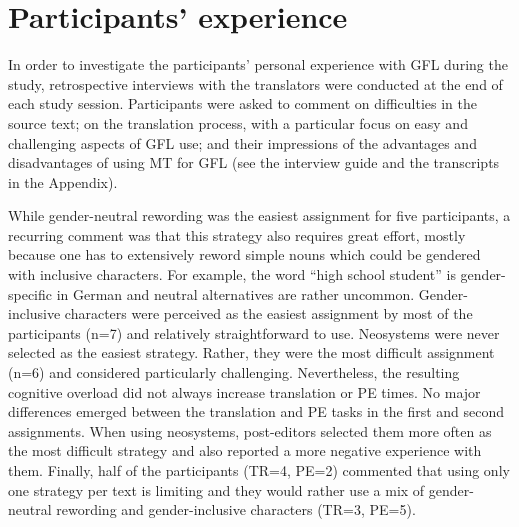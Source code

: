 \section{Participants' experience} \label{sec:cognitiveeffort}
In order to investigate the participants' personal experience with GFL during the study, retrospective interviews with the translators were conducted at the end of each study session. Participants were asked to comment on difficulties in the source text; on the translation process, with a particular focus on easy and challenging aspects of GFL use; and their impressions of the advantages and disadvantages of using MT  for GFL (see the interview guide and the transcripts in the Appendix). %

While gender-neutral rewording was the easiest assignment for five participants, a recurring comment was that this strategy also requires great effort, mostly because one has to extensively reword simple nouns which could be gendered with inclusive characters. For example, the word ``high school student'' is gender-specific in German and neutral alternatives are rather uncommon. Gender-inclusive characters were perceived as the easiest assignment by most of the participants (n=7) and relatively straightforward to use. Neosystems were never selected as the easiest strategy. Rather, they were the most difficult assignment (n=6) and considered particularly challenging. Nevertheless, the resulting cognitive overload did not always increase translation or PE times. No major differences emerged between the translation and PE tasks in the first and second assignments. When using neosystems, post-editors selected them more often as the most difficult strategy and also reported a more negative experience with them. Finally, half of the participants (TR=4, PE=2) commented that using only one strategy per text is limiting and they would rather use a mix of gender-neutral rewording and gender-inclusive characters (TR=3, PE=5). 

